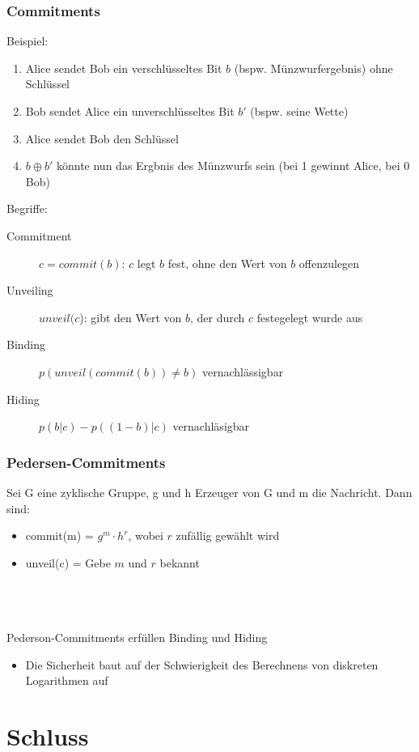 \begin{frame}
	\frametitle{Commitments}
	Beispiel:
	\begin{enumerate}
		\item Alice sendet Bob ein verschlüsseltes Bit $b$ (bspw. Münzwurfergebnis) ohne Schlüssel
		\item Bob sendet Alice ein unverschlüsseltes Bit $b'$ (bspw. seine Wette)
		\item Alice sendet Bob den Schlüssel
		\item $b \oplus b'$ könnte nun das Ergbnis des Münzwurfs sein (bei 1 gewinnt Alice, bei 0 Bob)
	\end{enumerate}
	Begriffe:
	\begin{description}
		\item[Commitment] $c = commit(b)$: $c$ legt $b$ fest, ohne den Wert von $b$ offenzulegen
		\item[Unveiling] $unveil(c$): gibt den Wert von $b$, der durch $c$ festegelegt wurde aus
		\item[Binding] $p(unveil(commit(b)) \neq b)$ vernachlässigbar
		\item[Hiding] $p(b|c) - p((1-b)|c)$ vernachläsigbar
	\end{description}
\end{frame}

\begin{frame}
	\frametitle{Pedersen-Commitments}
	Sei G eine zyklische Gruppe, g und h Erzeuger von G und m die Nachricht. Dann sind:
	\begin{itemize}
		\item commit(m) = $g^m \cdot h^r$, wobei $r$ zufällig gewählt wird
		\item unveil(c) = Gebe $m$ und $r$ bekannt
	\end{itemize}~\\~\\~\\
	Pederson-Commitments erfüllen Binding und Hiding
	\begin{itemize}
		\item Die Sicherheit baut auf der Schwierigkeit des Berechnens von diskreten Logarithmen auf
	\end{itemize}
\end{frame}

\section{Schluss}
